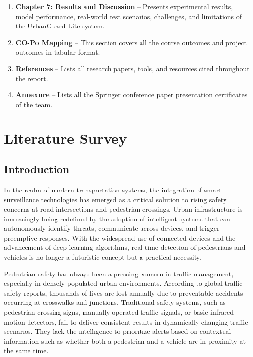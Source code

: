 \documentclass[a4paper, 12pt]{report}
\begin{document}
\begin{enumerate}[itemsep=-4pt, label=\textbf{\roman*.}]
\item \textbf{Chapter 7: Results and Discussion} -- 
Presents experimental results, model performance, real-world test scenarios, challenges, and limitations of the UrbanGuard-Lite system.

\item \textbf{CO-Po Mapping} --
This section covers all the course outcomes and project outcomes in tabular format.

\item \textbf{References} -- 
Lists all research papers, tools, and resources cited throughout the report.

\item \textbf{Annexure} -- 
Lists all the Springer conference paper presentation certificates of the team.
\end{enumerate}


\chapter{Literature Survey}

\section{Introduction}
In the realm of modern transportation systems, the integration of smart surveillance technologies has emerged as a critical solution to rising safety concerns at road intersections and pedestrian crossings. Urban infrastructure is increasingly being redefined by the adoption of intelligent systems that can autonomously identify threats, communicate across devices, and trigger preemptive responses. With the widespread use of connected devices and the advancement of deep learning algorithms, real-time detection of pedestrians and vehicles is no longer a futuristic concept but a practical necessity.

Pedestrian safety has always been a pressing concern in traffic management, especially in densely populated urban environments. According to global traffic safety reports, thousands of lives are lost annually due to preventable accidents occurring at crosswalks and junctions. Traditional safety systems, such as pedestrian crossing signs, manually operated traffic signals, or basic infrared motion detectors, fail to deliver consistent results in dynamically changing traffic scenarios. They lack the intelligence to prioritize alerts based on contextual information such as whether both a pedestrian and a vehicle are in proximity at the same time.
\end{document}
